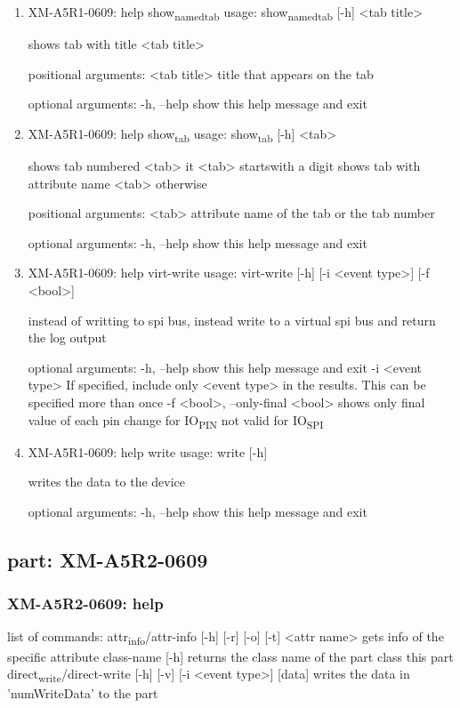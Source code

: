 \documentclass[11pt]{article}
\begin{document}
\begin{enumerate}
\item XM-A5R1-0609: help show\textsubscript{named}\textsubscript{tab}
\label{sec:orge4a7881}
usage: show\textsubscript{named}\textsubscript{tab} [-h] <tab title>

shows tab with title <tab title>

positional arguments:
  <tab title>  title that appears on the tab

optional arguments:
  -h, --help   show this help message and exit

\item XM-A5R1-0609: help show\textsubscript{tab}
\label{sec:org3da4c7f}
usage: show\textsubscript{tab} [-h] <tab>

shows tab numbered <tab> it <tab> startswith a digit shows tab with attribute
name <tab> otherwise

positional arguments:
  <tab>       attribute name of the tab or the tab number

optional arguments:
  -h, --help  show this help message and exit

\item XM-A5R1-0609: help virt-write
\label{sec:orgd730394}
usage: virt-write [-h] [-i <event type>] [-f <bool>]

instead of writting to spi bus, instead write to a virtual spi bus and return
the log output

optional arguments:
  -h, --help            show this help message and exit
  -i <event type>       If specified, include only <event type> in the
                        results. This can be specified more than once
  -f <bool>, --only-final <bool>
                        shows only final value of each pin change for IO\textsubscript{PIN}
                        not valid for IO\textsubscript{SPI}

\item XM-A5R1-0609: help write
\label{sec:orgf4a33b5}
usage: write [-h]

writes the data to the device

optional arguments:
  -h, --help  show this help message and exit
\end{enumerate}

\subsection{part: XM-A5R2-0609}
\label{sec:org3edf9e9}
\subsubsection{XM-A5R2-0609: help}
\label{sec:org4bf98d0}
list of commands:
  attr\textsubscript{info}/attr-info [-h] [-r] [-o] [-t] <attr name>
    gets info of the specific attribute
  class-name [-h]
    returns the class name of the part class this part
  direct\textsubscript{write}/direct-write [-h] [-v] [-i <event type>] [data]
    writes the data in 'numWriteData' to the part
\end{document}
